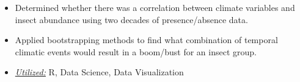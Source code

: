 \documentclass[10pt,a4paper,ragged2e]{altacv}
\begin{document}
\begin{itemize}
  \item Determined whether there was a correlation between climate variables and insect abundance using two decades of presence/absence data.
  \item Applied bootstrapping methods to find what combination of temporal climatic events would result in a boom/bust for an insect group.
  \item \underline{\textit{Utilized:}} R, Data Science, Data Visualization
\end{itemize}


\clearpage
\nocite{*}
\end{document}
